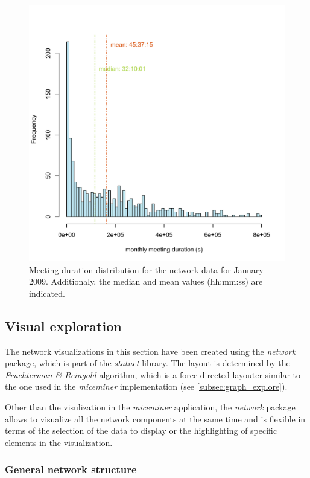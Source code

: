 \begin{figure}[htpb]
\begin{center}
  \includegraphics[width=.75\textwidth]{assets/pdf/meeting_frequency_january.pdf}
  \caption[Histogram of monthly meeting duration]{Meeting duration distribution for the network data for January 2009. Additionaly, the median and mean values (hh:mm:ss) are indicated.}
  \label{fig:meeting_frequency_januray}
\end{center}
\end{figure}   

\subsection{Visual exploration}
\label{subsec:visual_exploration}

The network visualizations in this section have been created using the \textit{network}\cite{network:08} package, which is part of the \textit{statnet}\cite{statnet:03} library. The layout is determined by the \textit{Fruchterman \& Reingold}\cite{fruchterman:91} algorithm, which is a force directed layouter similar to the one used in the \textit{miceminer} implementation (see \ref{subsec:graph_explore}).

Other than the visulization in the \textit{miceminer} application, the \textit{network} package allows to visualize all the network components at the same time and is flexible in terms of the selection of the data to display or the highlighting of specific elements in the visualization.

\subsubsection{General network structure}
\label{subsubsec:vis_general}    

